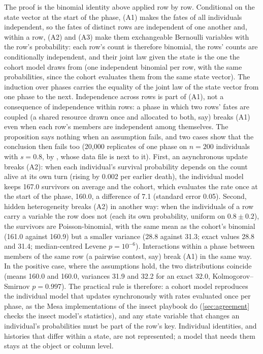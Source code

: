 \noindent The proof is the binomial identity above applied row by row. Conditional on the
state vector at the start of the phase, (A1) makes the fates of all individuals
independent, so the fates of distinct rows are independent of one another and, within a
row, (A2) and (A3) make them exchangeable Bernoulli variables with the row's probability:
each row's count is therefore binomial, the rows' counts are conditionally independent,
and their joint law given the state is the one the cohort model draws from (one
independent binomial per row, with the same probabilities, since the cohort evaluates them
from the same state vector). The induction over phases carries the equality of the joint
law of the state vector from one phase to the next. Independence across rows is part of
(A1), not a consequence of independence within rows: a phase in which two rows' fates are
coupled (a shared resource drawn once and allocated to both, say) breaks (A1) even when
each row's members are independent among themselves. The proposition says nothing when an
assumption fails, and two cases show that the conclusion then fails too
(20,000 replicates of one phase on $n = 200$ individuals with $s = 0.8$, by
, whose data file is next to it). First, an
asynchronous update breaks (A2): when each individual's survival probability depends on the
count alive at its own turn (rising by 0.002 per earlier death), the individual model keeps
167.0 survivors on average and the cohort, which evaluates the rate once at the start of the
phase, 160.0, a difference of 7.1 (standard error 0.05). Second, hidden heterogeneity breaks
(A2) in another way: when the individuals of a row carry a variable the row does not (each
its own probability, uniform on $0.8 \pm 0.2$), the survivors are Poisson-binomial, with the
same mean as the cohort's binomial (161.0 against 160.9) but a smaller variance (28.8 against
31.3; exact values 28.8 and 31.4; median-centred Levene $p = 10^{-6}$). Interactions within
a phase between members of the same row (a pairwise contest, say) break (A1) in the same
way. In the positive case, where the assumptions hold, the two distributions coincide (means
160.0 and 160.0, variances 31.9 and 32.2 for an exact 32.0, Kolmogorov--Smirnov $p = 0.997$).
The practical rule is therefore: a cohort model reproduces the individual model that updates
synchronously with rates evaluated once per phase, as the Mesa implementations of the insect
playbook do (\cref{sec:agreement} checks the insect model's statistics), and any state
variable that changes an individual's probabilities must be part of the row's key.
Individual identities, and histories that differ within a state, are not represented; a
model that needs them stays at the object or column level.

